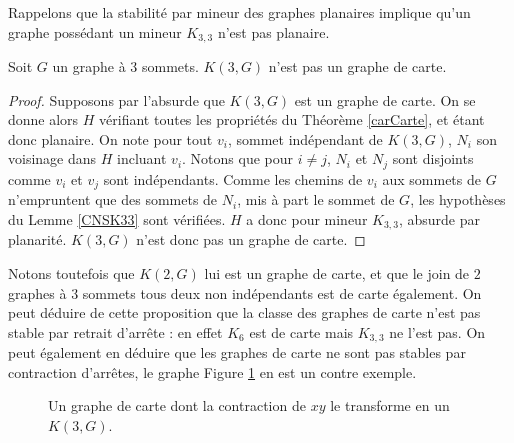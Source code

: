 \documentclass{scrartcl}
\begin{document}
\begin{flushleft}
Rappelons que la stabilité par mineur des graphes planaires implique qu'un graphe possédant un mineur $K_{3,3}$ n'est pas planaire.

\begin{prop}\label{K3G}
    Soit $G$ un graphe à $3$ sommets. $K(3, G)$ n'est pas un graphe de carte.
\end{prop}

\begin{proof}
    Supposons par l'absurde que $K(3, G)$ est un graphe de carte. On se donne alors $H$ vérifiant toutes les propriétés
    du Théorème \ref{carCarte}, et étant donc planaire. On note pour tout $v_i$, sommet indépendant de $K(3, G)$,
    $N_i$ son voisinage dans $H$ incluant $v_i$. Notons que pour $i \neq j$, $N_i$ et $N_j$ sont disjoints comme
    $v_i$ et $v_j$ sont indépendants. Comme les chemins de $v_i$ aux sommets de $G$ n'empruntent que des sommets de
    $N_i$, mis à part le sommet de $G$, les hypothèses du Lemme \ref{CNSK33} sont vérifiées. $H$ a donc pour mineur $K_{3,3}$,
    absurde par planarité. $K(3, G)$ n'est donc pas un graphe de carte.
\end{proof}

Notons toutefois que $K(2, G)$ lui est un graphe de carte, et que le join de $2$ graphes à $3$ sommets tous deux non indépendants
est de carte également. On peut déduire de cette proposition que la classe des graphes de carte n'est pas stable par retrait d'arrête :
en effet $K_6$ est de carte mais $K_{3,3}$ ne l'est pas. On peut également en déduire que les graphes de carte ne sont pas stables
par contraction d'arrêtes, le graphe Figure \ref{nonstabcontrarr} en est un contre exemple.

\begin{figure}[h]
    \caption{Un graphe de carte dont la contraction de $xy$ le transforme en un $K(3, G)$.}\label{nonstabcontrarr}
    \vspace*{0.5cm}
    \begin{center}
\end{center}
\end{figure}
\end{flushleft}
\end{document}
